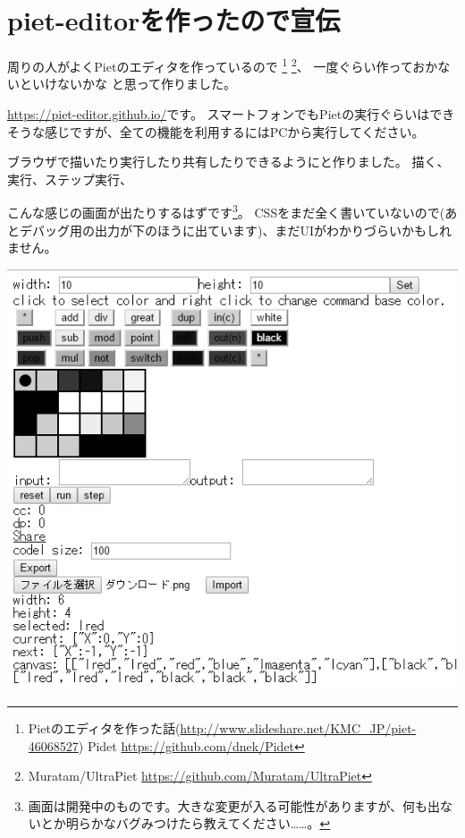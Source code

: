 \chapter[piet-editorを作ったので宣伝]{piet-editorを作ったので宣伝}

周りの人がよくPietのエディタを作っているので
\footnote{Pietのエディタを作った話(\url{http://www.slideshare.net/KMC_JP/piet-46068527}) Pidet \url{https://github.com/dnek/Pidet}}
\footnote{Muratam/UltraPiet \url{https://github.com/Muratam/UltraPiet}}、
一度ぐらい作っておかないといけないかな と思って作りました。

\url{https://piet-editor.github.io/}です。
スマートフォンでもPietの実行ぐらいはできそうな感じですが、全ての機能を利用するにはPCから実行してください。

ブラウザで描いたり実行したり共有したりできるようにと作りました。
描く、実行、ステップ実行、

こんな感じの画面が出たりするはずです\footnote{画面は開発中のものです。大きな変更が入る可能性がありますが、何も出ないとか明らかなバグみつけたら教えてください……。}。
CSSをまだ全く書いていないので(あとデバッグ用の出力が下のほうに出ています)、まだUIがわかりづらいかもしれません。
\begin{center}
  \includegraphics{images/editor_g.png}
\end{center}
